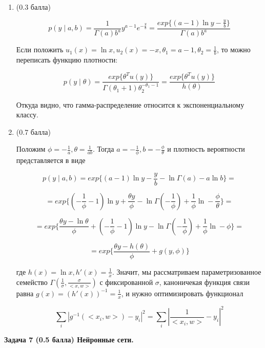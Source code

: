 \documentclass[10pt]{article}
\begin{document}
	
	\begin{enumerate}
		\item{(0.3 балла)} 
		
		$$p(y\mid a, b) = \frac1{\Gamma(a)b^a}{y^{a-1}e^{-\frac{y}{b}}} = \frac{exp\{(a-1)\ln y - \frac{y}{b} \}}{\Gamma(a)b^a}$$
		
		Если положить $u_1(x) = \ln x, u_2(x) = -x, \theta_1 = a-1, \theta_2 = \frac{1}{b}$, то можно переписать функцию плотности:
		
		$$p(y\mid \theta) = \frac{exp\{\theta^T u(y) \}}{\Gamma(\theta_1 + 1)\theta_2^{-\theta_1 - 1}} = \frac{exp\{\theta^T u(y) \}}{h(\theta)}$$
		
		Откуда видно, что гамма-распределение относится к экспоненциальному классу.
		
		\item{(0.7 балла)} 
		
		Положим $\phi = -\frac{1}{a}, \theta = \frac{1}{ab}$. Тогда $a = -\frac{1}{\phi}, b = -\frac{\phi}{\theta}$ и плотность вероятности представляется в виде
		
		$$p(y\mid a, b)  =exp\{(a-1)\ln y -\frac{y}{b} -\ln \Gamma(a) - a\ln b \}   = $$
		
		$$= exp\{(-\frac{1}{\phi}-1)\ln y +\frac{\theta y}{\phi} -\ln \Gamma(-\frac{1}{\phi}) +\frac{1}{\phi}\ln -\frac{\phi}{\theta} \} =$$
		
		$$= exp\{ \frac{\theta y - \ln \theta}{\phi}  + (-\frac{1}{\phi}-1)\ln y -\ln \Gamma(-\frac{1}{\phi}) +\frac{1}{\phi}\ln -\phi \} =$$
		
		$$ = exp\{ \frac{\theta y - h(\theta)}{\phi}  + g(y, \phi) \}$$
		
		где $h(x) = \ln x, h'(x) = \frac{1}{x}$. Значит, мы рассматриваем параметризованное семейство $\Gamma(\frac{1}{\sigma}, \frac{\sigma}{<x,w>})$ с фиксированной $\sigma$, каноничекая функция связи равна $g(x) = (h'(x))^{-1} = \frac{1}{x}$, и нужно оптимизировать функционал 
		
		$$ \sum_i | g^{-1}( <x_i,w>) - y _i|^2 = \sum_i \left| \frac{1}{<x_i,w>} - y_i \right|^2 $$
	
\end{enumerate}
	\bigskip
	
	\textbf{Задача 7 (0.5 балла) Нейронные сети.}
	
\end{document}
